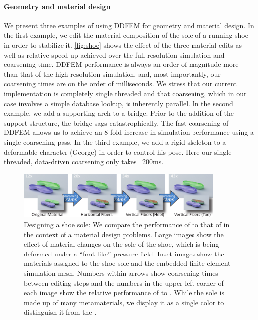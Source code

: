 \paragraph{Geometry and material design} We present three examples of using DDFEM for geometry and material design. In the first example, we edit the material composition of the sole of a running shoe in order to stabilize it. \autoref{fig:shoe} shows the effect of the three material edits as well as relative speed up achieved over the full resolution simulation and coarsening time. DDFEM performance is always an order of magnitude more than that of the high-resolution simulation, and, most importantly, our coarsening times are on the order of milliseconds. We stress that our current implementation is completely single threaded and that coarsening, which in our case involves a simple database lookup, is inherently parallel.
In the second example, we add a supporting arch to a bridge. Prior to the addition of the support structure, the bridge sags catastrophically. The fast coarsening of DDFEM allows us to achieve an 8 fold increase in simulation performance using a single coarsening pass. In the third example, we add a rigid skeleton to a deformable character (George) in order  to control his pose. Here our single threaded, data-driven coarsening only takes ~200ms.  
\begin{figure}
	\centering
	\includegraphics[width=0.90\textwidth]{images/DesignExampleShoe}
	\caption{Designing a shoe sole: We compare the performance of {\DDFEM} to that of {\HiRes} in the context of a material design problems. Large images show the effect of material changes on the sole of the shoe, which is being deformed under a ``foot-like'' pressure field. Inset images show the materials assigned to the shoe sole and the embedded finite element simulation mesh. Numbers within arrows show coarsening times between editing steps and the numbers in the upper left corner of each image show the relative performance of {\DDFEM} to  {\HiRes}. While the {\DDFEM} sole is made up of many metamaterials, we display it as a single color to distinguish it from the {\HiRes}.}
	\label{fig:shoe}
\end{figure}

